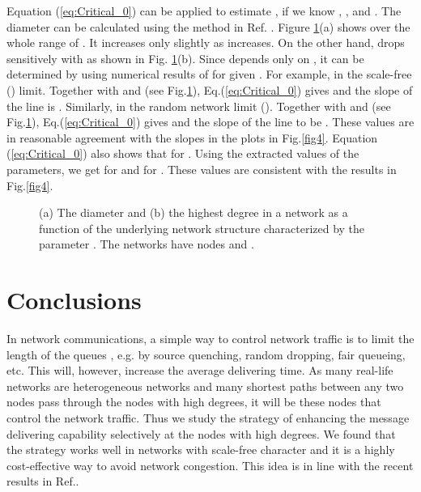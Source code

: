 \documentclass[aps,prl,twocolumn,superscriptaddress,showpacs]{revtex4}
\begin{document}
Equation (\ref{eq:Critical_0}) can be applied to estimate
, if we know , , and .
The diameter  can be calculated using the method in Ref.
\cite{LL:2002}. Figure \ref{fig5}(a) shows  over the whole
range of .  It increases only slightly as  increases.  On
the other hand,  drops sensitively with  as shown
in Fig. \ref{fig5}(b).  Since  depends only on ,
it can be determined by using numerical results of  for
given .  For example, 
in the scale-free () limit.  Together with  and
 (see Fig.\ref{fig5}), Eq.(\ref{eq:Critical_0})
gives  and the slope of the line
 is .  Similarly,
 in the random network limit
().  Together with  and  (see
Fig.\ref{fig5}), Eq.(\ref{eq:Critical_0}) gives
 and the slope of the line
 to be .  These values are in reasonable
agreement with the slopes in the plots in Fig.\ref{fig4}. Equation
(\ref{eq:Critical_0}) also shows that  for .  Using the
extracted values of the parameters, we get  for  and  for . These
values are consistent with the results in Fig.\ref{fig4}.

\begin{figure}
\begin{center}
 \caption{(a) The
diameter  and (b) the highest degree  in a
network as a function of the underlying network structure
characterized by the parameter .  The networks have 
nodes and .} \label{fig5}
\end{center}
\end{figure}

\section{Conclusions}
In network communications, a simple way to control network traffic
is to limit the length of the queues \cite{Csa:1994}, e.g. by
source quenching, random dropping, fair queueing, etc.  This will,
however, increase the average delivering time.  As many real-life
networks are heterogeneous networks and many shortest paths
between any two nodes pass through the nodes with high degrees, it
will be these nodes that control the network traffic.  Thus we
study the strategy of enhancing the message delivering capability
selectively at the nodes with high degrees.  We found that the
strategy works well in networks with scale-free character and it
is a highly cost-effective way to avoid network congestion. This
idea is in line with the recent results in
Ref.\cite{Adilson:2004,Zoltan:2004}.
\end{document}
